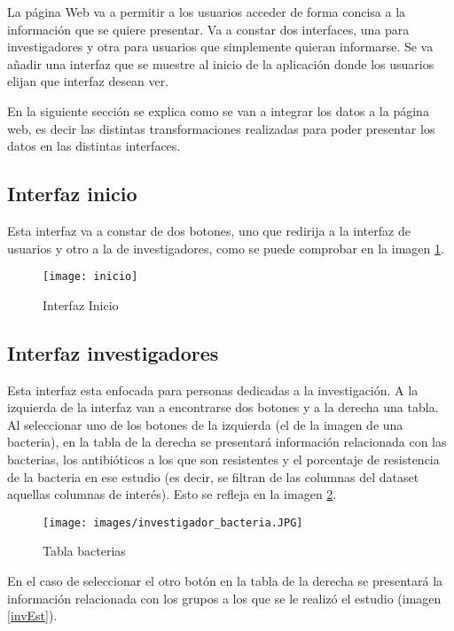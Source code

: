 \documentclass[../main.tex]{subfiles}
\begin{document}
La página Web va a permitir a los usuarios acceder de forma concisa a la información que se quiere presentar. Va a constar dos interfaces, una para investigadores y otra para usuarios que simplemente quieran informarse. Se va añadir una interfaz que se muestre al inicio de la aplicación donde los usuarios elijan que interfaz desean ver.

En la siguiente sección se explica como se van a integrar los datos a la página web, es decir las distintas transformaciones realizadas para poder presentar los datos en las distintas interfaces.

\subsection{Interfaz inicio}

Esta interfaz va a constar de dos botones, uno que redirija a la interfaz de usuarios y otro a la de investigadores, como se puede comprobar en la imagen \ref{inc}.

\begin{figure}[ht]
    \centering
    \texttt{[image: inicio]}
    \caption{Interfaz Inicio}
    \label{inc}
\end{figure}

\newpage

\subsection{Interfaz investigadores}

Esta interfaz esta enfocada para personas dedicadas a la investigación. A la izquierda de la interfaz van a encontrarse dos botones y a la derecha una tabla. Al seleccionar uno de los botones de la izquierda (el de la imagen de una bacteria), en la tabla de la derecha se presentará información relacionada con las bacterias, los antibióticos a los que son resistentes y el porcentaje de resistencia de la bacteria en ese estudio (es decir, se filtran de las columnas del dataset aquellas columnas de interés). Esto se refleja en la imagen \ref{invBac}.

\begin{figure}[ht]
    \centering
    \texttt{[image: images/investigador\_bacteria.JPG]}
    \caption{Tabla bacterias}
    \label{invBac}
\end{figure}


En el caso de seleccionar el otro botón en la tabla de la derecha se presentará la información relacionada con los grupos a los que se le realizó el estudio (imagen  \ref{invEst}).
\end{document}
